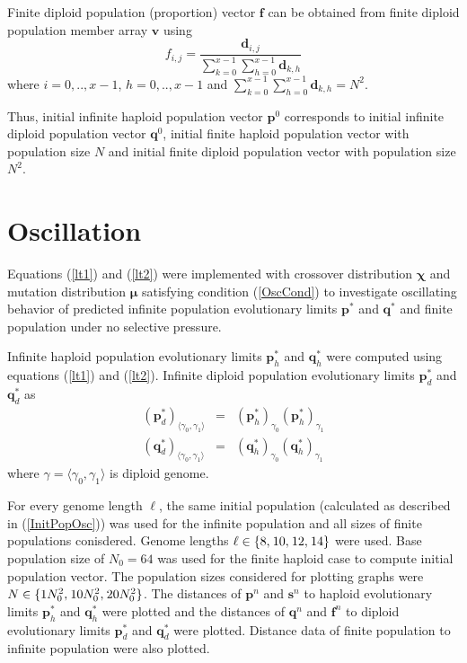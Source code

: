 Finite diploid population (proportion) vector $\bm{f}$ can be obtained from finite diploid population member array $\bm{v}$  using
\[
f_{i,j} = \frac{\bm{d}_{i,j}}{\sum \limits_{k=0}^{x-1} \sum \limits_{h=0}^{x-1} \bm{d}_{k,h}}
\]
where $i = 0,.., x-1$, $h = 0,.., x-1$ and $\sum \limits_{k=0}^{x-1} \sum \limits_{h=0}^{x-1} \bm{d}_{k,h} = N^2$.

Thus, initial infinite haploid population vector $\bm{p}^0$ corresponds to initial infinite diploid population vector $\bm{q}^0$, initial finite 
haploid population vector with population size $N$ and initial finite diploid population vector with population size $N^2$.

\section{Oscillation}
\label{Oscillation}

Equations (\ref{lt1}) and (\ref{lt2}) were implemented with crossover distribution $\bm{\chi}$ and mutation distribution $\bm{\mu}$ satisfying 
condition (\ref{OscCond}) to investigate oscillating behavior of predicted infinite population evolutionary limits $\bm{p}^{\ast}$ and $\bm{q}^{\ast}$ 
and finite population under no selective pressure.

Infinite haploid population evolutionary limits $\bm{p}_h^{\ast}$ and $\bm{q}_h^{\ast}$ were computed using equations (\ref{lt1}) and (\ref{lt2}). 
Infinite diploid population evolutionary limits $\bm{p}_d^{\ast}$ and $\bm{q}_d^{\ast}$ as
\begin{eqnarray*}
({\bm{p}_d^{\ast}})_{\langle \gamma_0, \gamma_1 \rangle} & = & ({\bm{p}_h^{\ast}})_{\gamma_0} ({\bm{p}_h^{\ast}})_{\gamma_1} \\
({\bm{q}_d^{\ast}})_{\langle \gamma_0, \gamma_1 \rangle} & = & ({\bm{q}_h^{\ast}})_{\gamma_0} ({\bm{q}_h^{\ast}})_{\gamma_1}
\end{eqnarray*}
where $\gamma = \langle \gamma_0, \gamma_1 \rangle$ is diploid genome.

For every genome length $\ell$, the same initial population (calculated as described in (\ref{InitPopOsc})) was used for the infinite population and all 
sizes of finite populations conisdered.
Genome lengths $\ell \in \{8, \hspace{0.01in}10, \hspace{0.01in}12, \hspace{0.01in}14\}$ were used. Base population size of $N_0 = 64$ was used 
for the finite haploid case to compute initial population vector. The population sizes considered for plotting 
graphs were $N \in \{1N_0^2, \hspace{0.01in}10N_0^2, \hspace{0.01in}20N_0^2\}$. 
The distances of $\bm{p}^n$ and $\bm{s}^n$ to haploid evolutionary limits $\bm{p}_h^{\ast}$ and 
$\bm{q}_h^{\ast}$ were plotted and the distances of $\bm{q}^n$ and 
$\bm{f}^n$ to diploid evolutionary limits $\bm{p}_d^{\ast}$ and $\bm{q}_d^{\ast}$ were plotted. 
Distance data of finite population to infinite population were also plotted.


